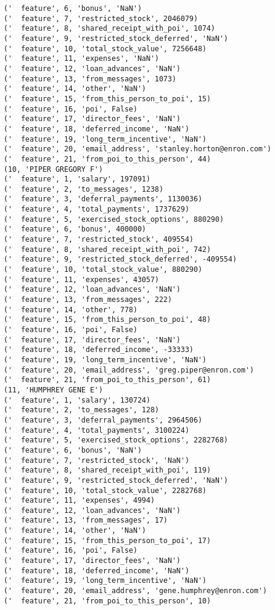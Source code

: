 \begin{verbatim}
('  feature', 6, 'bonus', 'NaN')
('  feature', 7, 'restricted_stock', 2046079)
('  feature', 8, 'shared_receipt_with_poi', 1074)
('  feature', 9, 'restricted_stock_deferred', 'NaN')
('  feature', 10, 'total_stock_value', 7256648)
('  feature', 11, 'expenses', 'NaN')
('  feature', 12, 'loan_advances', 'NaN')
('  feature', 13, 'from_messages', 1073)
('  feature', 14, 'other', 'NaN')
('  feature', 15, 'from_this_person_to_poi', 15)
('  feature', 16, 'poi', False)
('  feature', 17, 'director_fees', 'NaN')
('  feature', 18, 'deferred_income', 'NaN')
('  feature', 19, 'long_term_incentive', 'NaN')
('  feature', 20, 'email_address', 'stanley.horton@enron.com')
('  feature', 21, 'from_poi_to_this_person', 44)
(10, 'PIPER GREGORY F')
('  feature', 1, 'salary', 197091)
('  feature', 2, 'to_messages', 1238)
('  feature', 3, 'deferral_payments', 1130036)
('  feature', 4, 'total_payments', 1737629)
('  feature', 5, 'exercised_stock_options', 880290)
('  feature', 6, 'bonus', 400000)
('  feature', 7, 'restricted_stock', 409554)
('  feature', 8, 'shared_receipt_with_poi', 742)
('  feature', 9, 'restricted_stock_deferred', -409554)
('  feature', 10, 'total_stock_value', 880290)
('  feature', 11, 'expenses', 43057)
('  feature', 12, 'loan_advances', 'NaN')
('  feature', 13, 'from_messages', 222)
('  feature', 14, 'other', 778)
('  feature', 15, 'from_this_person_to_poi', 48)
('  feature', 16, 'poi', False)
('  feature', 17, 'director_fees', 'NaN')
('  feature', 18, 'deferred_income', -33333)
('  feature', 19, 'long_term_incentive', 'NaN')
('  feature', 20, 'email_address', 'greg.piper@enron.com')
('  feature', 21, 'from_poi_to_this_person', 61)
(11, 'HUMPHREY GENE E')
('  feature', 1, 'salary', 130724)
('  feature', 2, 'to_messages', 128)
('  feature', 3, 'deferral_payments', 2964506)
('  feature', 4, 'total_payments', 3100224)
('  feature', 5, 'exercised_stock_options', 2282768)
('  feature', 6, 'bonus', 'NaN')
('  feature', 7, 'restricted_stock', 'NaN')
('  feature', 8, 'shared_receipt_with_poi', 119)
('  feature', 9, 'restricted_stock_deferred', 'NaN')
('  feature', 10, 'total_stock_value', 2282768)
('  feature', 11, 'expenses', 4994)
('  feature', 12, 'loan_advances', 'NaN')
('  feature', 13, 'from_messages', 17)
('  feature', 14, 'other', 'NaN')
('  feature', 15, 'from_this_person_to_poi', 17)
('  feature', 16, 'poi', False)
('  feature', 17, 'director_fees', 'NaN')
('  feature', 18, 'deferred_income', 'NaN')
('  feature', 19, 'long_term_incentive', 'NaN')
('  feature', 20, 'email_address', 'gene.humphrey@enron.com')
('  feature', 21, 'from_poi_to_this_person', 10)

\end{verbatim}
